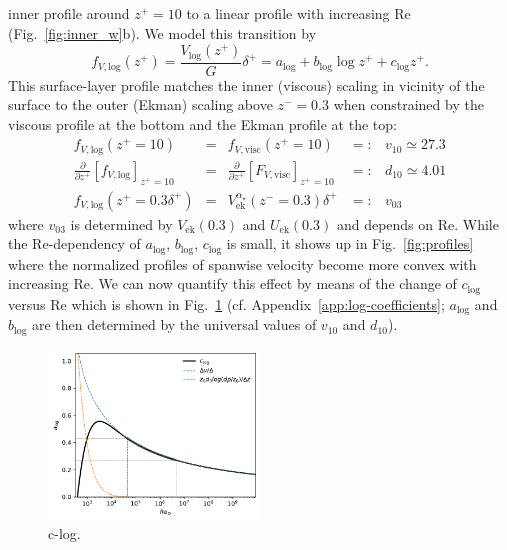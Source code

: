 \documentclass[a4paper,11pt]{amsart}
\newcommand{\p}{\partial}
\newcommand{\RE}{\mathrm{Re}}
\begin{document}
inner profile around $z^+=10$ to a linear profile with increasing $\RE$ (Fig.~\ref{fig:inner_w}b).
%
We model this transition by 
%
\begin{equation}
  f_{V,\mathrm{log}}(z^+) = \frac{V_\mathrm{log}(z^+)}{G} \delta^+ = a_\mathrm{log} + b_\mathrm{log} \log z^+ + c_\mathrm{log} z^+. 
\end{equation} 
%
This surface-layer profile matches the inner (viscous) scaling in vicinity of the surface to the outer
(Ekman) scaling above $z^-=0.3$ when constrained by the viscous profile at the bottom and the
Ekman profile at the top:
%
\begin{align}
  f_{V,\mathrm{log}}(z^+=10) &=& f_{V,\mathrm{visc}}(z^+=10) &=:& v_{10} \simeq 27.3\\
  \frac{\p}{\p z^+} \left[ f_{V,\mathrm{log}}\right]_{z^+=10} &=& \frac{\p}{\p z^+}\left[ F_{V,\mathrm{visc}}\right]_{z^+=10} &=:&d_{10}\simeq 4.01 \\
  f_{V,\mathrm{log}}(z^+=0.3\delta^+) &=& V^{\alpha_\star}_\mathrm{ek}(z^-=0.3)\delta^+&=:& v_{03} 
\end{align}
where $v_{03}$ is determined by $V_\mathrm{ek}(0.3)$ and $U_\mathrm{ek}(0.3)$ and depends on $\RE$.
%
While the $\RE$-dependency of $a_\mathrm{log}$, $b_\mathrm{log}$, $c_\mathrm{log}$
is small, it shows up in Fig.~\ref{fig:profiles} where the normalized profiles
of spanwise velocity become more convex with increasing $\RE$.
%
We can now quantify this effect by means of the change of $c_\mathrm{log}$ versus $\RE$ which is shown in
Fig.~\ref{fig:clog} (cf. Appendix~\ref{app:log-coefficients};
$a_\mathrm{log}$ and $b_\mathrm{log}$ are then determined by the universal
values of $v_{10}$ and $d_{10}$).
%
%
\begin{figure}
  \includegraphics[width=0.5\textwidth]{../plot/c_log.pdf}
  \caption{c-log.
    \label{fig:clog}}
\end{figure} 
%
\end{document}
